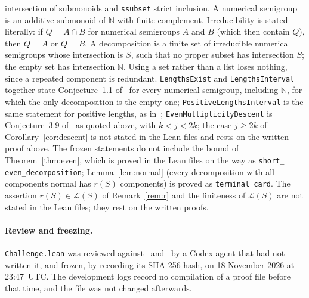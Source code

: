 \documentclass[11pt]{article}
\theoremstyle{definition}
\theoremstyle{remark}
\newcommand{\N}{\mathbb N}
\begin{document}
{intersection of submonoids and \texttt{ssubset} strict inclusion. A numerical
semigroup is an additive submonoid of $\N$ with finite complement. Irreducibility is stated literally: if $Q=A\cap B$ for numerical
semigroups $A$ and $B$ (which then contain $Q$), then $Q=A$ or $Q=B$. A
decomposition is a finite set of irreducible numerical semigroups whose
intersection is $S$, such that no proper subset has intersection $S$; the
empty set has intersection $\N$. Using a set rather than a list loses nothing,
since a repeated component is redundant. \texttt{LengthsExist} and
\texttt{LengthsInterval} together state Conjecture~1.1 of~\cite{go} for every
numerical semigroup, including $\N$, for which the only decomposition is the
empty one; \texttt{PositiveLengthsInterval} is the same statement for positive
lengths, as in~\cite{g}; \texttt{EvenMultiplicityDescent} is Conjecture~3.9 of~\cite{go} as quoted above, with $k<j<2k$; the case $j\ge 2k$ of Corollary~\ref{cor:descent} is not stated in the Lean files and rests on the written proof above. The frozen statements do not include the bound of Theorem~\ref{thm:even},
which is proved in the Lean files on the way as \texttt{short\_\allowbreak
even\_\allowbreak decomposition}; Lemma~\ref{lem:normal} (every decomposition
with all components normal has $r(S)$ components) is proved as
\texttt{terminal\_\allowbreak card}. The assertion $r(S)\in\mathcal L(S)$ of
Remark~\ref{rem:r} and the finiteness of $\mathcal L(S)$ are not stated in the
Lean files; they rest on the written proofs.

\paragraph{Review and freezing.}
\texttt{Challenge.lean} was reviewed against~\cite{go} and~\cite{g} by a Codex
agent that had not written it, and frozen, by recording its SHA-256 hash, on
18 November 2026 at 23:47~UTC. The development logs record no compilation of a
proof file before that time, and the file was not changed afterwards.

}
\end{document}
